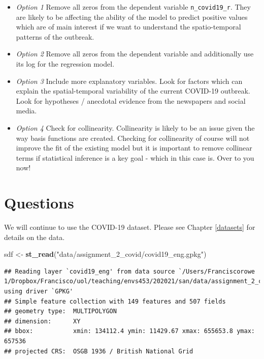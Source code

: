 \documentclass[
]{book}
\newenvironment{Shaded}{\begin{snugshade}}{\end{snugshade}}
\newcommand{\KeywordTok}[1]{\textcolor[rgb]{0.13,0.29,0.53}{\textbf{#1}}}
\newcommand{\NormalTok}[1]{#1}
\newcommand{\StringTok}[1]{\textcolor[rgb]{0.31,0.60,0.02}{#1}}
\providecommand{\tightlist}{%
  \setlength{\itemsep}{0pt}\setlength{\parskip}{0pt}}
\begin{document}
\begin{itemize}
\tightlist
\item
  \emph{Option 1} Remove all zeros from the dependent variable \texttt{n\_covid19\_r}. They are likely to be affecting the ability of the model to predict positive values which are of main interest if we want to understand the spatio-temporal patterns of the outbreak.
\item
  \emph{Option 2} Remove all zeros from the dependent variable and additionally use its log for the regression model.
\item
  \emph{Option 3} Include more explanatory variables. Look for factors which can explain the spatial-temporal variability of the current COVID-19 outbreak. Look for hypotheses / anecdotal evidence from the newspapers and social media.
\item
  \emph{Option 4} Check for collinearity. Collinearity is likely to be an issue given the way basis functions are created. Checking for collinearity of course will not improve the fit of the existing model but it is important to remove collinear terms if statistical inference is a key goal - which in this case is. Over to you now!
\end{itemize}

\hypertarget{questions-6}{%
\section{Questions}\label{questions-6}}

We will continue to use the COVID-19 dataset. Please see Chapter \ref{datasets} for details on the data.

\begin{Shaded}
\begin{Highlighting}[]
\NormalTok{sdf <-}\StringTok{ }\KeywordTok{st_read}\NormalTok{(}\StringTok{"data/assignment_2_covid/covid19_eng.gpkg"}\NormalTok{)}
\end{Highlighting}
\end{Shaded}

\begin{verbatim}
## Reading layer `covid19_eng' from data source `/Users/Franciscorowe 1/Dropbox/Francisco/uol/teaching/envs453/202021/san/data/assignment_2_covid/covid19_eng.gpkg' using driver `GPKG'
## Simple feature collection with 149 features and 507 fields
## geometry type:  MULTIPOLYGON
## dimension:      XY
## bbox:           xmin: 134112.4 ymin: 11429.67 xmax: 655653.8 ymax: 657536
## projected CRS:  OSGB 1936 / British National Grid
\end{verbatim}
\end{document}
